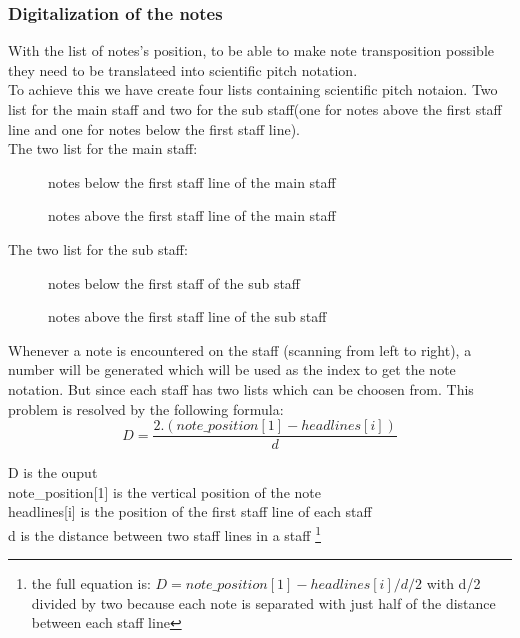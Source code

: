 \documentclass[a4paper,12pt]{report}
\begin{document}
\subsubsection{Digitalization of the notes}
With the list of notes's position, to be able to make note transposition possible
they need to be translateed into scientific pitch notation.\\

To achieve this we have create four lists containing scientific pitch notaion.
Two list for the main staff and two for the sub staff(one for notes above the
first staff line and one for notes below the first staff line).\\

The two list for the main staff:
\begin{figure}[h]
\centering
\makebox[\textwidth]{['E5','D5','C5','B4','A4','G4','F4','E4','D4','C4','B3','A3','G3','F3','E3','D3','C3']}
\caption{notes below the first staff line of the main staff}
\vspace{\baselineskip}
\makebox[\textwidth]{['E5','F5','G5','A5','B5','C6','D6','E6','F6','G6']}
\caption{notes above the first staff line of the main staff}
\end{figure}

\vspace{\baselineskip}
The two list for the sub staff:
\begin{figure}[h]
\centering
\makebox[\textwidth]{['G3','F3','E3','D3','C3','B2','A2','G2','F2','E2','D2','C2','B1','A1','G1','F1','E1']}
\caption{notes below the first staff of the sub staff}
\vspace{\baselineskip}
\makebox[\textwidth]{['G3','A3','B3','C4','D4','E4','F4','G4','A4','B4']}
\caption{notes above the first staff line of the sub staff}
\end{figure}

Whenever a note is encountered on the staff (scanning from left to right), a
number will be generated which will be used as the index to get the note
notation. But since each staff has two lists which can be choosen from. This
problem is resolved by the following formula:\\

\[D = \frac{2.(note\_position[1] - headlines[i])}{d}\]

\noindent D is the ouput\\
note\_position[1] is the vertical position of the note\\
headlines[i] is the position of the first staff line of each staff\\
d is the distance between two staff lines in a staff \footnote{the 
full equation is: \(D = note\_position[1] -headlines[i] / d/2\)
with d/2 divided by two because each note is separated with just half of the distance between
each staff line}\\
\end{document}
